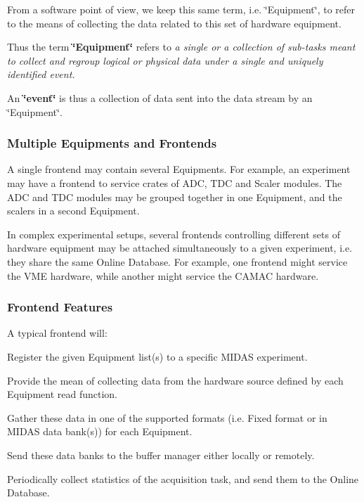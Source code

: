 From a software point of view, we keep this same term, i.e. \char`\"{}Equipment\char`\"{}, to refer to the means of collecting the data related to this set of hardware equipment. \par
 Thus the term {\bfseries \char`\"{}Equipment\char`\"{}} refers to {\itshape  a single or a collection of sub-\/tasks meant to collect and regroup logical or physical data under a single and uniquely identified event.\/} \par
 \label{FrontendOperation_Event_definition}
\hypertarget{FrontendOperation_Event_definition}{}
 An {\bfseries \char`\"{}event\char`\"{}} is thus a collection of data sent into the data stream by an \char`\"{}Equipment\char`\"{}. \par
\hypertarget{FrontendOperation_FE_multi}{}\subsubsection{Multiple Equipments and Frontends}\label{FrontendOperation_FE_multi}
A single frontend may contain several Equipments. For example, an experiment may have a frontend to service crates of ADC, TDC and Scaler modules. The ADC and TDC modules may be grouped together in one Equipment, and the scalers in a second Equipment.

In complex experimental setups, several frontends controlling different sets of hardware equipment may be attached simultaneously to a given experiment, i.e. they share the same Online Database. For example, one frontend might service the VME hardware, while another might service the CAMAC hardware.\hypertarget{FrontendOperation_FE_features}{}\subsubsection{Frontend Features}\label{FrontendOperation_FE_features}
A typical frontend will:


\begin{DoxyItemize}
\item Register the given Equipment list(s) to a specific MIDAS experiment.
\item Provide the mean of collecting data from the hardware source defined by each Equipment read function.
\item Gather these data in one of the supported formats (i.e. Fixed format or in MIDAS data bank(s)) for each Equipment.
\item Send these data banks to the buffer manager either locally or remotely.
\item Periodically collect statistics of the acquisition task, and send them to the Online Database.
\end{DoxyItemize}

